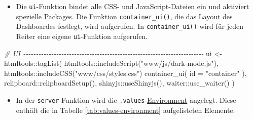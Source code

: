 \documentclass[
]{article}
\newenvironment{Shaded}{\begin{snugshade}}{\end{snugshade}}
\newcommand{\AttributeTok}[1]{\textcolor[rgb]{0.77,0.63,0.00}{#1}}
\newcommand{\CommentTok}[1]{\textcolor[rgb]{0.56,0.35,0.01}{\textit{#1}}}
\newcommand{\FunctionTok}[1]{\textcolor[rgb]{0.00,0.00,0.00}{#1}}
\newcommand{\NormalTok}[1]{#1}
\newcommand{\OtherTok}[1]{\textcolor[rgb]{0.56,0.35,0.01}{#1}}
\newcommand{\SpecialCharTok}[1]{\textcolor[rgb]{0.00,0.00,0.00}{#1}}
\newcommand{\StringTok}[1]{\textcolor[rgb]{0.31,0.60,0.02}{#1}}
\providecommand{\tightlist}{%
  \setlength{\itemsep}{0pt}\setlength{\parskip}{0pt}}
\begin{document}
\begin{itemize}
\tightlist
\item
  Die \texttt{ui}-Funktion bindet alle CSS- und JavaScript-Dateien ein und aktiviert spezielle Packages. Die Funktion \texttt{container\_ui()}, die das Layout des Dashboardes festlegt, wird aufgerufen. In \texttt{container\_ui()} wird für jeden Reiter eine eigene \texttt{ui}-Funktion aufgerufen.
\end{itemize}

\begin{Shaded}
\begin{Highlighting}[]
    \CommentTok{\# UI {-}{-}{-}{-}{-}{-}{-}{-}{-}{-}{-}{-}{-}{-}{-}{-}{-}{-}{-}{-}{-}{-}{-}{-}{-}{-}{-}{-}{-}{-}{-}{-}{-}{-}{-}{-}{-}{-}{-}{-}{-}{-}{-}{-}{-}{-}{-}{-}{-}{-}{-}{-}{-}{-}{-}{-}{-}{-}{-}{-}{-}{-}{-}{-}{-}{-}{-}{-}{-}{-}{-}}
\NormalTok{    ui }\OtherTok{\textless{}{-}}\NormalTok{ htmltools}\SpecialCharTok{::}\FunctionTok{tagList}\NormalTok{(}
\NormalTok{        htmltools}\SpecialCharTok{::}\FunctionTok{includeScript}\NormalTok{(}\StringTok{"www/js/dark{-}mode.js"}\NormalTok{),}
\NormalTok{        htmltools}\SpecialCharTok{::}\FunctionTok{includeCSS}\NormalTok{(}\StringTok{"www/css/styles.css"}\NormalTok{)}
        \FunctionTok{container\_ui}\NormalTok{(}
            \AttributeTok{id =} \StringTok{"container"}
\NormalTok{        ),}
\NormalTok{        rclipboard}\SpecialCharTok{::}\FunctionTok{rclipboardSetup}\NormalTok{(),}
\NormalTok{        shinyjs}\SpecialCharTok{::}\FunctionTok{useShinyjs}\NormalTok{(),}
\NormalTok{        waiter}\SpecialCharTok{::}\FunctionTok{use\_waiter}\NormalTok{()}
\NormalTok{    )}
\end{Highlighting}
\end{Shaded}

\begin{itemize}
\tightlist
\item
  In der \texttt{server}-Funktion wird die \texttt{.values}-\href{https://adv-r.hadley.nz/environments.html}{Environment} angelegt. Diese enthält die in Tabelle \ref{tab:values-environment} aufgelisteten Elemente.
\end{itemize}
\end{document}
